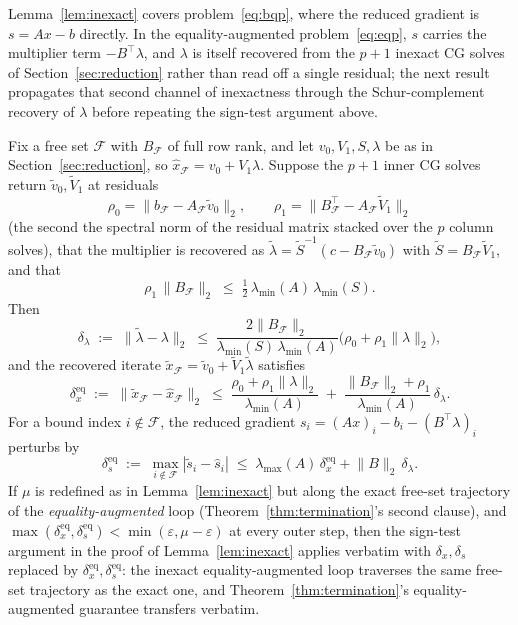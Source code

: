 Lemma~\ref{lem:inexact} covers problem~\eqref{eq:bqp}, where the reduced gradient is
$s = Ax - b$ directly. In the equality-augmented problem~\eqref{eq:eqp}, $s$ carries the
multiplier term $-B^\top\lambda$, and $\lambda$ is itself recovered from the $p+1$ inexact CG
solves of Section~\ref{sec:reduction} rather than read off a single residual; the next result
propagates that second channel of inexactness through the Schur-complement recovery of
$\lambda$ before repeating the sign-test argument above.

\begin{corollary}\label{cor:inexact-eq}
Fix a free set $\mathcal{F}$ with $B_{\mathcal{F}}$ of full row rank, and let $v_0, V_1, S,
\lambda$ be as in Section~\ref{sec:reduction}, so $\hat x_{\mathcal{F}} = v_0 + V_1\lambda$.
Suppose the $p+1$ inner CG solves return $\tilde v_0, \tilde V_1$ at residuals
\[
  \rho_0 = \lVert b_{\mathcal{F}} - A_{\mathcal{F}}\tilde v_0 \rVert_2, \qquad
  \rho_1 = \lVert B_{\mathcal{F}}^\top - A_{\mathcal{F}}\tilde V_1 \rVert_2
\]
(the second the spectral norm of the residual matrix stacked over the $p$ column solves), that
the multiplier is recovered as $\tilde\lambda = \tilde S^{-1}(c - B_{\mathcal{F}}\tilde v_0)$
with $\tilde S = B_{\mathcal{F}}\tilde V_1$, and that
\begin{equation}\label{eq:eqresid}
  \rho_1\,\lVert B_{\mathcal{F}} \rVert_2 \;\le\; \tfrac{1}{2}\,\lambda_{\min}(A)\,\lambda_{\min}(S).
\end{equation}
Then
\[
  \delta_\lambda \;:=\; \lVert \tilde\lambda - \lambda \rVert_2 \;\le\;
  \frac{2\lVert B_{\mathcal{F}} \rVert_2}{\lambda_{\min}(S)\,\lambda_{\min}(A)}
  \big(\rho_0 + \rho_1 \lVert \lambda \rVert_2\big),
\]
and the recovered iterate $\tilde x_{\mathcal{F}} = \tilde v_0 + \tilde V_1\tilde\lambda$
satisfies
\[
  \delta_x^{\mathrm{eq}} \;:=\; \lVert \tilde x_{\mathcal{F}} - \hat x_{\mathcal{F}} \rVert_2
  \;\le\; \frac{\rho_0 + \rho_1\lVert\lambda\rVert_2}{\lambda_{\min}(A)}
  \;+\; \frac{\lVert B_{\mathcal{F}} \rVert_2 + \rho_1}{\lambda_{\min}(A)}\,\delta_\lambda.
\]
For a bound index $i \notin \mathcal{F}$, the reduced gradient $s_i = (Ax)_i - b_i -
(B^\top\lambda)_i$ perturbs by
\[
  \delta_s^{\mathrm{eq}} \;:=\; \max_{i \notin \mathcal{F}} |\tilde s_i - \hat s_i| \;\le\;
  \lambda_{\max}(A)\,\delta_x^{\mathrm{eq}} + \lVert B \rVert_2\,\delta_\lambda.
\]
If $\mu$ is redefined as in Lemma~\ref{lem:inexact} but along the exact free-set trajectory of
the \emph{equality-augmented} loop (Theorem~\ref{thm:termination}'s second clause), and
$\max(\delta_x^{\mathrm{eq}}, \delta_s^{\mathrm{eq}}) < \min(\varepsilon, \mu - \varepsilon)$ at
every outer step, then the sign-test argument in the proof of Lemma~\ref{lem:inexact} applies
verbatim with $\delta_x, \delta_s$ replaced by $\delta_x^{\mathrm{eq}}, \delta_s^{\mathrm{eq}}$:
the inexact equality-augmented loop traverses the same free-set trajectory as the exact one,
and Theorem~\ref{thm:termination}'s equality-augmented guarantee transfers verbatim.
\end{corollary}

